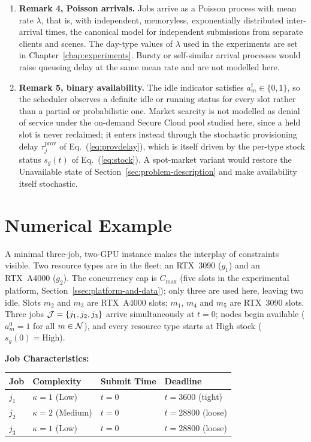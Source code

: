 \begin{enumerate}
\item \textbf{Remark 4, Poisson arrivals.} Jobs arrive as a Poisson process with mean rate $\lambda$, that is, with independent, memoryless, exponentially distributed inter-arrival times, the canonical model for independent submissions from separate clients and scenes. The day-type values of $\lambda$ used in the experiments are set in Chapter~\ref{chap:experiments}. Bursty or self-similar arrival processes would raise queueing delay at the same mean rate and are not modelled here.

\item \textbf{Remark 5, binary availability.} The idle indicator satisfies $a_m^t \in \{0,1\}$, so the scheduler observes a definite idle or running status for every slot rather than a partial or probabilistic one. Market scarcity is not modelled as denial of service under the on-demand Secure Cloud pool studied here, since a held slot is never reclaimed; it enters instead through the stochastic provisioning delay $\tau^{\text{prov}}_j$ of Eq.~(\ref{eq:provdelay}), which is itself driven by the per-type stock status $s_g(t)$ of Eq.~(\ref{eq:stock}). A spot-market variant would restore the Unavailable state of Section~\ref{sec:problem-description} and make availability itself stochastic.
\end{enumerate}

\section{Numerical Example}
\label{sec:numerical-example}

A minimal three-job, two-GPU instance makes the interplay of constraints visible. Two resource types are in the fleet: an RTX~3090 ($g_1$) and an RTX~A4000 ($g_2$). The concurrency cap is $C_{\max}$ (five slots in the experimental platform, Section~\ref{ssec:platform-and-data}); only three are used here, leaving two idle. Slots $m_2$ and $m_3$ are RTX~A4000 slots; $m_1$, $m_4$ and $m_5$ are RTX~3090 slots. Three jobs $\mathcal{J} = \{j_1, j_2, j_3\}$ arrive simultaneously at $t = 0$; nodes begin available ($a_m^0 = 1$ for all $m \in \mathcal{N}$), and every resource type starts at High stock ($s_g(0) = \text{High}$).

\textbf{Job Characteristics:}
\begin{center}
\begin{tabular}{llll}
\toprule
\textbf{Job}&\textbf{Complexity}&\textbf{Submit Time}&\textbf{Deadline}\\
\midrule
$j_1$&$\kappa = 1$ (Low)&$t=0$&$t=3600$ (tight)\\
$j_2$&$\kappa = 2$ (Medium)&$t=0$&$t=28800$ (loose)\\
$j_3$&$\kappa = 1$ (Low)&$t=0$&$t=28800$ (loose)\\
\bottomrule
\end{tabular}
\end{center}

